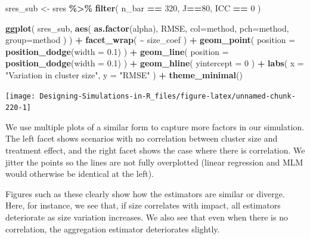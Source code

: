 \documentclass[
]{book}
\newenvironment{Shaded}{\begin{snugshade}}{\end{snugshade}}
\newcommand{\AttributeTok}[1]{\textcolor[rgb]{0.13,0.29,0.53}{#1}}
\newcommand{\DecValTok}[1]{\textcolor[rgb]{0.00,0.00,0.81}{#1}}
\newcommand{\FloatTok}[1]{\textcolor[rgb]{0.00,0.00,0.81}{#1}}
\newcommand{\FunctionTok}[1]{\textcolor[rgb]{0.13,0.29,0.53}{\textbf{#1}}}
\newcommand{\NormalTok}[1]{#1}
\newcommand{\OtherTok}[1]{\textcolor[rgb]{0.56,0.35,0.01}{#1}}
\newcommand{\SpecialCharTok}[1]{\textcolor[rgb]{0.81,0.36,0.00}{\textbf{#1}}}
\newcommand{\StringTok}[1]{\textcolor[rgb]{0.31,0.60,0.02}{#1}}
\begin{document}
\begin{Shaded}
\begin{Highlighting}[]
\NormalTok{sres\_sub }\OtherTok{\textless{}{-}}\NormalTok{ sres }\SpecialCharTok{\%\textgreater{}\%}
  \FunctionTok{filter}\NormalTok{( n\_bar }\SpecialCharTok{==} \DecValTok{320}\NormalTok{, J}\SpecialCharTok{==}\DecValTok{80}\NormalTok{, ICC }\SpecialCharTok{==} \DecValTok{0}\NormalTok{ )}

\FunctionTok{ggplot}\NormalTok{( sres\_sub, }\FunctionTok{aes}\NormalTok{( }\FunctionTok{as.factor}\NormalTok{(alpha), RMSE, }
                       \AttributeTok{col=}\NormalTok{method, }\AttributeTok{pch=}\NormalTok{method, }\AttributeTok{group=}\NormalTok{method ) ) }\SpecialCharTok{+}
  \FunctionTok{facet\_wrap}\NormalTok{( }\SpecialCharTok{\textasciitilde{}}\NormalTok{ size\_coef ) }\SpecialCharTok{+}
  \FunctionTok{geom\_point}\NormalTok{( }\AttributeTok{position =} \FunctionTok{position\_dodge}\NormalTok{(}\AttributeTok{width =} \FloatTok{0.1}\NormalTok{) ) }\SpecialCharTok{+} 
  \FunctionTok{geom\_line}\NormalTok{( }\AttributeTok{position =} \FunctionTok{position\_dodge}\NormalTok{(}\AttributeTok{width =} \FloatTok{0.1}\NormalTok{) ) }\SpecialCharTok{+}
  \FunctionTok{geom\_hline}\NormalTok{( }\AttributeTok{yintercept =} \DecValTok{0}\NormalTok{ ) }\SpecialCharTok{+}
  \FunctionTok{labs}\NormalTok{( }\AttributeTok{x =} \StringTok{"Variation in cluster size"}\NormalTok{, }\AttributeTok{y =} \StringTok{"RMSE"}\NormalTok{ ) }\SpecialCharTok{+}
  \FunctionTok{theme\_minimal}\NormalTok{() }
\end{Highlighting}
\end{Shaded}

\begin{center}\texttt{[image: Designing-Simulations-in-R\_files/figure-latex/unnamed-chunk-220-1]} \end{center}

We use multiple plots of a similar form to capture more factors in our simulation.
The left facet shows scenarios with no correlation between cluster size and treatment effect, and the right facet shows the case where there is correlation.
We jitter the points so the lines are not fully overplotted (linear regression and MLM would otherwise be identical at the left).

Figures such as these clearly show how the estimators are similar or diverge.
Here, for instance, we see that, if size correlates with impact, all estimators deteriorate as size variation increases.
We also see that even when there is no correlation, the aggregation estimator deteriorates slightly.
\end{document}
